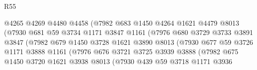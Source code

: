 \begin{lexlean}{R55}
\begin{coremodule}
                                @4265
                                @4269
                                @4480
                                @4458
                                (@7982
                                  @683
                                  @1450
                                  @4264
                                  @1621
                                  @4479
                                  @8013
                                  (@7930
                                    @681
                                    @59
                                    @3734
                                    @1171
                                    @3847
                                    @1161
                                    (@7976
                                      @680
                                      @3729
                                      @3733
                                      @3891
                                      @3847
                                      (@7982
                                        @679
                                        @1450
                                        @3728
                                        @1621
                                        @3890
                                        @8013
                                        (@7930
                                          @677
                                          @59
                                          @3726
                                          @1171
                                          @3888
                                          @1161
                                          (@7976
                                            @676
                                            @3721
                                            @3725
                                            @3939
                                            @3888
                                            (@7982
                                              @675
                                              @1450
                                              @3720
                                              @1621
                                              @3938
                                              @8013
                                              (@7930
                                                @439
                                                @59
                                                @3718
                                                @1171
                                                @3936

\end{coremodule}
\end{lexlean}
